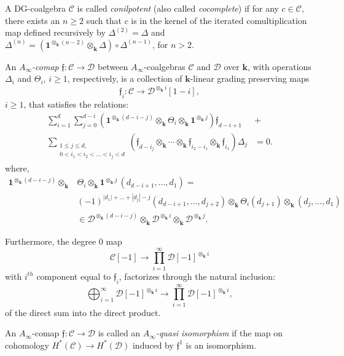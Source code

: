 \documentclass{gtpart}
\renewcommand{\k}{\mathbf{k}}
\renewcommand{\C}{\mathscr{C}}
\renewcommand{\D}{\mathscr{D}}
\newcommand{\id}{\mathbf{1}}
\begin{document}
A DG-coalgebra $\C$ is called \emph{conilpotent} (also called
\emph{cocomplete})  if for any $c\in \C$,
there exists an $n \geq 2$ such that $c$ is in the kernel of the iterated comultiplication map defined recursively by $\Delta^{(2)}=\Delta$ and 
$\Delta^{(n)}=(\id^{\otimes_\k (n-2)} \otimes_\k \Delta) \circ \Delta^{(n-1)}$, for $n>2$.


An \emph{$A_{\infty}$-comap} $\mathfrak{f} \colon\C\to\D$ between $A_{\infty}$-coalgebras $\C$ and $\D$ over
$\k$, with operations $\Delta_i$ and $\Theta_{i}$, $i\ge 1$, respectively, is a collection of $\k$-linear grading preserving maps 
\[ 
    \mathfrak{f}_i \colon \C \to \D^{\otimes_\k i}[1-i], 
\]
$i\ge 1$, that satisfies the relations:
\begin{align*} 
    \sum_{i=1}^{d} \sum_{j=0}^{d-i} \left(\id^{\otimes_\k (d-i-j)} \otimes_\k \Theta_i \otimes_\k
\id^{\otimes_\k j} \right) \mathfrak{f}_{d-i+1}  \ &+ \\ 
\sum_{\begin{smallmatrix}
1\le j\le d, \\
0<i_{1}<i_{2}<\dots<i_{j}<d
\end{smallmatrix}}  
\left( \mathfrak{f}_{d-i_j} \otimes_\k \cdots \otimes_\k \mathfrak{f}_{i_2-i_1} \otimes_\k \mathfrak{f}_{i_1} \right) \Delta_j   &= 0. 
\end{align*}
where, 
\begin{align*} 
    \id^{\otimes_\k (d-i-j)}\otimes_\k &\Theta_i\otimes_\k \id^{\otimes_\k j}\,(d_{d-i+1},\ldots, d_{1}) =\\
    &(-1)^{|d_{1}|+\ldots+|d_{j}|-j} (d_{d-i+1} , \ldots, d_{j+2})\otimes_\k \Theta_i(d_{j+1}) \otimes_\k (d_{j} ,
    \ldots , d_{1})\\
    & \in \D^{\otimes_\k (d-i-j)} \otimes_\k \D^{\otimes_\k i} \otimes_\k
    \D^{\otimes_\k j}. 
\end{align*}

Furthermore, the degree 0 map 
\[ \C[-1] \to \prod_{i=1}^\infty \D[-1]^{\otimes_\k i} \]
with $i^{th}$ component equal to $\mathfrak{f}_i$, factorizes through the natural inclusion:
\begin{equation} \label{factor} 
\bigoplus_{i=1}^\infty \D[-1]^{\otimes_\k i} \to \prod_{i=1}^\infty \D[-1]^{\otimes_\k i}, 
\end{equation}
of the direct sum into the direct product.    

An $A_\infty$-comap $\mathfrak{f} \colon \C \to \D$ is called an \emph{$A_\infty$-quasi isomorphism} if the map on
cohomology $H^*(\C) \to H^*(\D)$ induced by $\mathfrak{f}^1$ is an isomorphism.
\end{document}
